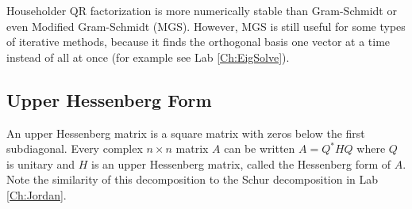 Householder QR factorization is more numerically stable than Gram-Schmidt or even Modified Gram-Schmidt (MGS). However, MGS is still useful for some types of iterative methods, because it finds the orthogonal basis one vector at a time instead of all at once (for example see Lab \ref{Ch:EigSolve}).

\subsection*{Upper Hessenberg Form}

An upper Hessenberg matrix is a square matrix with zeros below the first subdiagonal. Every complex \footnotemark $n \times n$ matrix $A$ can be written $A = Q^*HQ$ where $Q$ is unitary and $H$ is an upper Hessenberg matrix, called the Hessenberg form of $A$. Note the similarity of this decomposition to the Schur decomposition in Lab \ref{Ch:Jordan}. 

